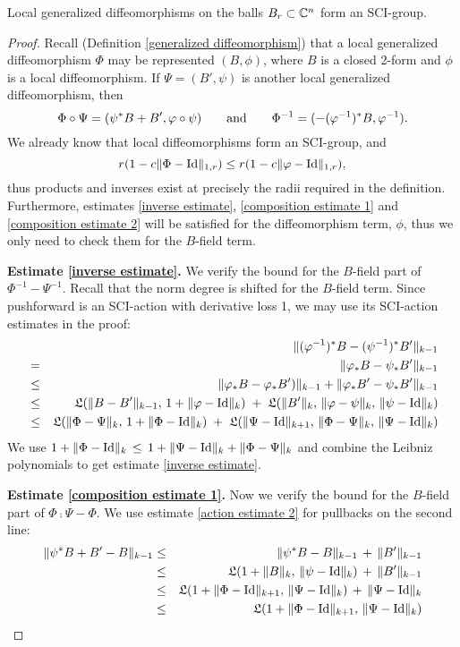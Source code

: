 \documentclass{article}
\begin{document}
\begin{lem}
Local generalized diffeomorphisms on the balls $B_r\subset\mathbb C^n$ form an SCI-group.
\end{lem}
\begin{proof}
Recall (Definition \ref{generalized diffeomorphism}) that a local generalized diffeomorphism $\Phi$ may be represented $(B,\phi)$, where $B$ is a closed 2-form and $\phi$ is a local diffeomorphism.  If $\Psi=(B',\psi)$ is another local generalized diffeomorphism, then
$$\Phi\circ\Psi = (\psi^*B+B',\varphi\circ\psi) \qquad\textnormal{and}\qquad \Phi^{-1} = (-(\varphi^{-1})^*B,\varphi^{-1}).$$
We already know that local diffeomorphisms form an SCI-group, and
$$r(1-c\|\Phi-\textrm{Id}\|_{1,r}) \leq r(1-c\|\varphi-\textrm{Id}\|_{1,r}),$$
thus products and inverses exist at precisely the radii required in the definition.  Furthermore, estimates \eqref{inverse estimate}, \eqref{composition estimate 1} and \eqref{composition estimate 2} will be satisfied for the diffeomorphism term, $\phi$, thus we only need to check them for the $B$-field term.

\textbf{Estimate \eqref{inverse estimate}.}  We verify the bound for the $B$-field part of ${\Phi^{-1}-\Psi^{-1}}$. Recall that the norm degree is shifted for the $B$-field term.  Since pushforward is an SCI-action with derivative loss 1, we may use its SCI-action estimates in the proof:
\begin{eqnarray*}
& & \|(\varphi^{-1})^*B - (\psi^{-1})^*B'\|_{k-1} \\
&=& \|\varphi_*B - \psi_*B'\|_{k-1} \\
&\leq& \|\varphi_*B-\varphi_*B')\|_{k-1} + \|\varphi_*B' - \psi_*B'\|_{k-1} \\
&\leq& \mathfrak{L}(\|B-B'\|_{k-1},\, 1+\|\varphi-\textrm{Id}\|_k) \;+\; \mathfrak{L}(\|B'\|_k,\, \|\varphi-\psi\|_k,\, \|\psi-\textrm{Id}\|_k) \\
&\leq& \mathfrak{L}(\|\Phi-\Psi\|_k,\, 1+\|\Phi-\textrm{Id}\|_k) \;+\; \mathfrak{L}(\|\Psi-\textrm{Id}\|_{k+1},\, \|\Phi-\Psi\|_k,\, \|\Psi-\textrm{Id}\|_k)
\end{eqnarray*}
We use $1+\|\Phi-\textrm{Id}\|_k \,\leq\, 1+\|\Psi-\textrm{Id}\|_k+\|\Phi-\Psi\|_k$ and combine the Leibniz polynomials to get estimate \eqref{inverse estimate}.

\textbf{Estimate \eqref{composition estimate 1}.}  Now we verify the bound for the $B$-field part of ${\Phi\comp\Psi-\Phi}$.  We use estimate \eqref{action estimate 2} for pullbacks on the second line:
\begin{eqnarray*}
\|\psi^*B+B'-B\|_{k-1} &\leq& \|\psi^*B-B\|_{k-1} \,+\, \|B'\|_{k-1} \\
&\leq& \mathfrak{L}(1+\|B\|_k,\, \|\psi-\textrm{Id}\|_k) \,+\, \|B'\|_{k-1} \\
&\leq& \mathfrak{L}(1+\|\Phi-\textrm{Id}\|_{k+1},\, \|\Psi-\textrm{Id}\|_k) \,+\, \|\Psi-\textrm{Id}\|_k \\
&\leq& \mathfrak{L}(1+\|\Phi-\textrm{Id}\|_{k+1},\, \|\Psi-\textrm{Id}\|_k)
\end{eqnarray*}


\end{proof}
\end{document}
